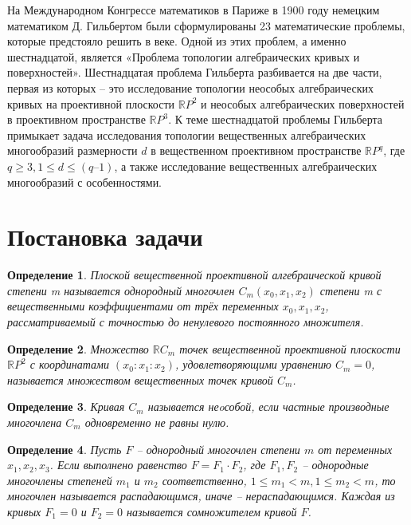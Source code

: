 \documentclass[14pt]{article}
\newtheorem{definition}{Определение}
\newcommand{\RomanNumeralCaps}[1]
    {\MakeUppercase{\romannumeral #1}}
\begin{document}
        На \RomanNumeralCaps{2} Международном Конгрессе математиков в Париже в 1900 году немецким математиком Д. Гильбертом были сформулированы 23 математические проблемы, которые предстояло решить в \RomanNumeralCaps{20} веке. Одной из этих проблем, а именно шестнадцатой, является «Проблема топологии алгебраических кривых и поверхностей». Шестнадцатая проблема Гильберта разбивается на две части, первая из которых – это исследование топологии неособых алгебраических кривых на проективной плоскости $\mathbb RP^2$ и неособых алгебраических поверхностей в проективном пространстве $\mathbb RP^3$. К теме шестнадцатой проблемы Гильберта примыкает задача исследования топологии вещественных алгебраических многообразий размерности $d$ в вещественном проективном пространстве $\mathbb RP^q$, где $q \geqslant 3, 1 \leqslant d \leqslant (q–1)$, а также исследование вещественных алгебраических многообразий с особенностями.
\newpage
\section{Постановка задачи}

\begin{definition}
 Плоской вещественной проективной алгебраической кривой степени m называется однородный многочлен $C_m(x_0, x_1, x_2)$ степени m с вещественными коэффициентами от трёх переменных $x_0, x_1, x_2$, рассматриваемый с точностью до ненулевого постоянного множителя.
\end{definition}

\begin{definition}
Множество $\mathbb RC_m$ точек вещественной проективной плоскости $\mathbb RP^2$ с координатами $(x_0:x_1:x_2)$, удовлетворяющими уравнению $C_m = 0$, называется множеством вещественных точек кривой $C_m$.
\end{definition}

\begin{definition}
Кривая $C_m$ называется неoсобой, если частные производные многочлена $C_m$ одновременно не равны нулю.
\end{definition}

\begin{definition}
Пусть $F$ -- однородный многочлен степени $m$ от переменных $x_1, x_2, x_3$. Если выполнено равенство $F = F_1 \cdot F_2$, где $F_1, F_2$ -- однородные многочлены степеней $m_1$ и $m_2$ соответственно, $1 \leqslant m_1 < m, 1 \leqslant m_2 < m$, то многочлен называется распадающимся, иначе -- нераспадающимся. Каждая из кривых $F_1 = 0$ и $F_2 = 0$ называется сомножителем кривой $F$.
\end{definition}
\end{document}
